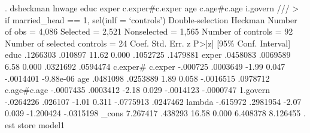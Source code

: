. dsheckman lnwage educ exper c.exper\#c.exper age c.age\#c.age i.govern  ///
>         if married_head == 1, sel(inlf = `controls')                    
{\smallskip}
Double-selection Heckman              Number of obs               =      4,086
                                      Selected                    =      2,521
                                      Nonselected                 =      1,565
                                      Number of controls          =         92
                                      Number of selected controls =         24
{\smallskip}
             {\VBAR}      Coef.   Std. Err.      z    P>|z|     [95\% Conf. Interval]
        educ {\VBAR}   .1266303    .010897    11.62   0.000     .1052725    .1479881
       exper {\VBAR}   .0458083   .0069589     6.58   0.000     .0321692    .0594474
             {\VBAR}
     c.exper\#{\VBAR}
     c.exper {\VBAR}   -.000725   .0003649    -1.99   0.047    -.0014401   -9.88e-06
             {\VBAR}
         age {\VBAR}   .0481098   .0253889     1.89   0.058    -.0016515    .0978712
             {\VBAR}
 c.age\#c.age {\VBAR}  -.0007435   .0003412    -2.18   0.029    -.0014123   -.0000747
             {\VBAR}
    1.govern {\VBAR}  -.0264226    .026107    -1.01   0.311    -.0775913    .0247462
      lambda {\VBAR}   -.615972   .2981954    -2.07   0.039    -1.200424   -.0315198
       _cons {\VBAR}   7.267417    .438293    16.58   0.000     6.408378    8.126455
{\smallskip}
. est store model1
{\smallskip}
